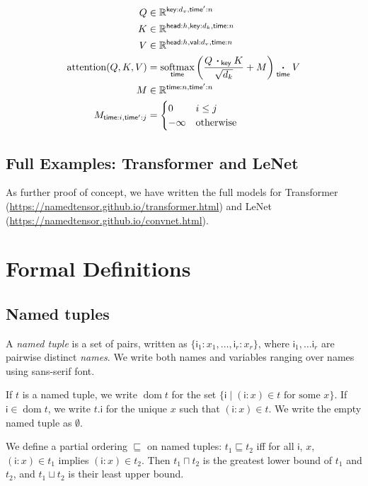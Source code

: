 \documentclass{article}
\newcommand{\name}[1]{\mathsf{#1}}
\newcommand{\ndot}[1]{\mathbin{\mathop{\thinspace\boldsymbol\cdot\thinspace}\displaylimits_{\name{#1}}}}
\newcommand{\nfun}[2]{\mathop{\text{#2}}\displaylimits_{\name{#1}}}
\newcommand{\reals}{\mathbb{R}}
\newcommand{\tuple}[1]{\{ #1\}}
\DeclareMathOperator{\tupledom}{dom}
\newcommand{\tupleproj}[2]{#1.#2}
\begin{document}
\begin{align*} 
Q &\in \reals^{\name{key}:d_v,\name{time'}:n}\\
K &\in \reals^{\name{head}:h,\name{key}:d_k, \name{time}:n}\\
V &\in \reals^{\name{head}:h, \name{val}:d_v, \name{time}:n}\\
\text{attention}(Q, K, V) &=  \nfun{time}{softmax} \left( \frac{Q \ndot{key} K }{\sqrt{d_k}} + M \right) \ndot{time} V \\
M & \in \reals^{\name{time}:n, \name{time'}:n} \\
M_{\name{time}:i, \name{time'}:j} & = \begin{cases}0 & i \leq j\\
-\infty & \text{otherwise} \end{cases} \\
\end{align*}


\subsection{Full Examples: Transformer and LeNet}

As further proof of concept, we have written the full models for Transformer (\url{https://namedtensor.github.io/transformer.html}) and LeNet (\url{https://namedtensor.github.io/convnet.html}). 

\section{Formal Definitions}
\label{sec:definitions}

\subsection{Named tuples}

A \emph{named tuple} is a set of pairs, written as $\tuple{\name{i}_1: x_1, \ldots, \name{i}_r: x_r}$, where $\name{i}_1, \ldots \name{i}_r$ are pairwise distinct \emph{names}. We write both names and variables ranging over names using sans-serif font.

If $t$ is a named tuple, we write $\tupledom{t}$ for the set $\{ \name{i} \mid \text{$(\name{i}:x) \in t$ for some $x$} \}$. If $\name{i} \in \tupledom{t}$, we write $\tupleproj{t}{\name{i}}$ for the unique $x$ such that $(\name{i}:x) \in t$. We write the empty named tuple as $\emptyset$.

We define a partial ordering $\sqsubseteq$ on named tuples: $t_1 \sqsubseteq t_2$ iff for all $\name{i}$, $x$, $(\name{i}:x) \in t_1$ implies $(\name{i}:x) \in t_2$. Then $t_1 \sqcap t_2$ is the greatest lower bound of $t_1$ and $t_2$, and $t_1 \sqcup t_2$ is their least upper bound.
\end{document}
